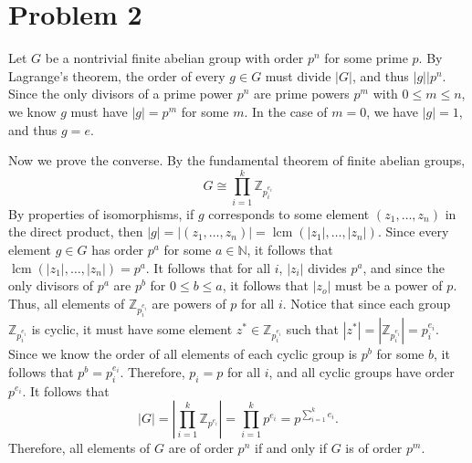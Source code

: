 \documentclass[11pt, letterpaper]{report}
\begin{document}
\section*{Problem 2}
\begin{solution}
	Let $G$ be a nontrivial finite abelian group with order $p^n$ for some prime $p$. By Lagrange's theorem, the order of every $g\in G$ must divide $\left| G \right| $, and thus $\left| g \right| |p^n$. Since the only divisors of a prime power $p^n$ are prime powers $p^m$ with $0\leq m\leq n$, we know $g$ must have $\left| g \right| =p^m$ for some $m$. In the case of $m=0$, we have $\left| g \right| =1$, and thus $g=e$.

	Now we prove the converse. By the fundamental theorem of finite abelian groups,
	\[
		G\cong \prod_{i=1}^{k} \mathbb{Z}_{p_i^{e_i}}
	\]
	By properties of isomorphisms, if $g$ corresponds to some element $\left( z_1, \dots, z_n  \right) $ in the direct product, then $\left| g \right| =\left| \left( z_1, \dots, z_n  \right)  \right| =\operatorname{lcm}(\left| z_1 \right| ,\ldots,\left| z_n \right| ) $. Since every element $g\in G $ has order $p^a$ for some $a\in\mathbb{N}$, it follows that $\operatorname{lcm}(\left| z_1 \right| ,\ldots,\left| z_n \right| ) =p^a$. It follows that for all $i$, $\left| z_i \right| $ divides $p^a$, and since the only divisors of $p^a$ are $p^b$ for $0\leq b\leq a$, it follows that $\left| z_o \right| $ must be a power of $p$. Thus, all elements of $\mathbb{Z}_{p_i^{e_i}}$ are powers of $p$ for all $i$. Notice that since each group $\mathbb{Z}_{p_i^{e_i}}$ is cyclic, it must have some element $z^*\in\mathbb{Z}_{p_i^{e_i}}$ such that $\left| z^* \right| =\left| \mathbb{Z}_{p_i^{e_i}} \right| =p_i^{e_i}$. Since we know the order of all elements of each cyclic group is $p^b$ for some $b$, it follows that $p^b=p_i^{e_i}$. Therefore, $p_i=p$ for all $i$, and all cyclic groups have order $p ^{e_i}$. It follows that
	\[
		\left| G \right| =\left| \prod_{i=1}^{k} \mathbb{Z}_{p ^{e_i}}  \right| =\prod_{i=1}^{k} p ^{e_i}=p ^{\sum_{i=1}^{k} e_i}
	.\]
	Therefore, all elements of $G$ are of order $p^n$ if and only if $G$ is of order $p^m$.
\end{solution}
\end{document}
